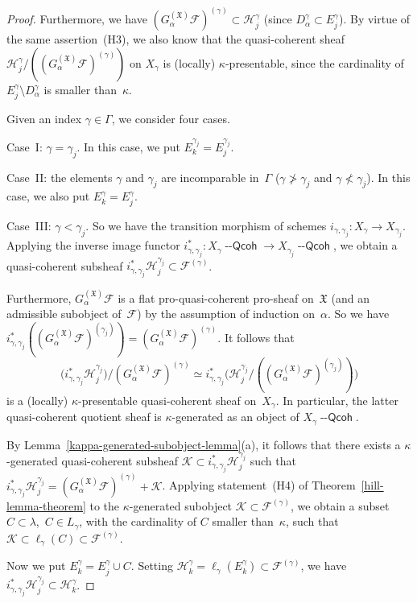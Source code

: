 \documentclass[12pt,a4paper]{amsart}
\newcommand{\+}{\protect\nobreakdash-}
\renewcommand{\:}{\colon}
\newcommand{\rarrow}{\longrightarrow}
\newcommand{\Qcoh}{{\operatorname{\mathsf{--Qcoh}}}}
\newcommand{\cK}{\mathcal K}
\newcommand{\cH}{\mathcal H}
\newcommand{\fX}{\mathfrak X}
\newcommand{\rF}{\mathscr F}
\theoremstyle{plain}
\theoremstyle{definition}
\begin{document}
\begin{proof}
 Furthermore, we have $(G^{(\fX)}_\alpha\rF)^{(\gamma)}\subset
\cH_j^\gamma$ (since $D_\alpha^\gamma\subset E_j^\gamma$).
 By virtue of the same assertion~(H3), we also know that
the quasi-coherent sheaf
$\cH_j^\gamma/((G^{(\fX)}_\alpha\rF)^{(\gamma)})$
on $X_\gamma$ is (locally) $\kappa$\+presentable, since 
the cardinality of $E_j^\gamma\setminus D_\alpha^\gamma$ is
smaller than~$\kappa$.

 Given an index $\gamma\in\Gamma$, we consider four cases.

 Case~I: $\gamma=\gamma_j$.
 In this case, we put $E_k^{\gamma_j}=E_j^{\gamma_j}$.

 Case~II: the elements $\gamma$ and $\gamma_j$ are incomparable
in~$\Gamma$ ($\gamma\not>\gamma_j$ and $\gamma\not<\gamma_j$).
 In this case, we also put $E_k^\gamma=E_j^\gamma$.

 Case~III: $\gamma<\gamma_j$.
 So we have the transition morphism of schemes $i_{\gamma,\gamma_j}\:
X_\gamma\rarrow X_{\gamma_j}$.
 Applying the inverse image functor $i^*_{\gamma,\gamma_j}\:
X_\gamma\Qcoh\rarrow X_{\gamma_j}\Qcoh$, we obtain a quasi-coherent
subsheaf $i_{\gamma,\gamma_j}^*\cH_j^{\gamma_j}\subset\rF^{(\gamma)}$.

 Furthermore, $G^{(\fX)}_\alpha\rF$ is a flat pro-quasi-coherent
pro-sheaf on~$\fX$ (and an admissible subobject of~$\rF$) by
the assumption of induction on~$\alpha$.
 So we have $i^*_{\gamma,\gamma_j}((G^{(\fX)}_\alpha\rF)^{(\gamma_j)})
=(G^{(\fX)}_\alpha\rF)^{(\gamma)}$.
 It follows that
$$
 \bigl(i_{\gamma,\gamma_j}^*\cH_j^{\gamma_j}\bigr)
 \big/(G^{(\fX)}_\alpha\rF)^{(\gamma)}\simeq
 i_{\gamma,\gamma_j}^*\bigl(\cH_j^{\gamma_j}/
 ((G^{(\fX)}_\alpha\rF)^{(\gamma_j)})\bigr)
$$
is a (locally) $\kappa$\+presentable quasi-coherent sheaf on~$X_\gamma$.
 In particular, the latter quasi-coherent quotient sheaf is
$\kappa$\+generated as an object of $X_\gamma\Qcoh$.

 By Lemma~\ref{kappa-generated-subobject-lemma}(a), it follows that
there exists a $\kappa$\+generated quasi-coherent subsheaf
$\cK\subset i_{\gamma,\gamma_j}^*\cH_j^{\gamma_j}$ such that
$i_{\gamma,\gamma_j}^*\cH_j^{\gamma_j}=
(G^{(\fX)}_\alpha\rF)^{(\gamma)}+\cK$.
 Applying statement~(H4) of Theorem~\ref{hill-lemma-theorem} to
the $\kappa$\+generated subobject $\cK\subset\rF^{(\gamma)}$,
we obtain a subset $C\subset\lambda$, \,$C\in L_\gamma$, with
the cardinality of $C$ smaller than~$\kappa$, such that
$\cK\subset\ell_\gamma(C)\subset\rF^{(\gamma)}$.

 Now we put $E_k^\gamma=E_j^\gamma\cup C$.
 Setting $\cH_k^\gamma=\ell_\gamma(E_k^\gamma)\subset\rF^{(\gamma)}$,
we have $i_{\gamma,\gamma_j}^*\cH_j^{\gamma_j}\subset\cH_k^\gamma$.


\end{proof}
\end{document}
